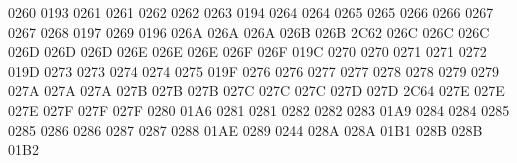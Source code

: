  0260 0193 %
 0261 0261 %
 0262 0262 %
 0263 0194 %
 0264 0264 %
 0265 0265 %
 0266 0266 %
 0267 0267 %
 0268 0197 %
 0269 0196 %
\setcclcuc 026A 026A 026A %
\setcclcuc 026B 026B 2C62 %
\setcclcuc 026C 026C 026C %
\setcclcuc 026D 026D 026D %
\setcclcuc 026E 026E 026E %
\setcclcuc 026F 026F 019C %
 0270 0270 %
 0271 0271 %
 0272 019D %
 0273 0273 %
 0274 0274 %
 0275 019F %
 0276 0276 %
 0277 0277 %
 0278 0278 %
 0279 0279 %
\setcclcuc 027A 027A 027A %
\setcclcuc 027B 027B 027B %
\setcclcuc 027C 027C 027C %
\setcclcuc 027D 027D 2C64 %
\setcclcuc 027E 027E 027E %
\setcclcuc 027F 027F 027F %
 0280 01A6 %
 0281 0281 %
 0282 0282 %
 0283 01A9 %
 0284 0284 %
 0285 0285 %
 0286 0286 %
 0287 0287 %
 0288 01AE %
 0289 0244 %
\setcclcuc 028A 028A 01B1 %
\setcclcuc 028B 028B 01B2 %
